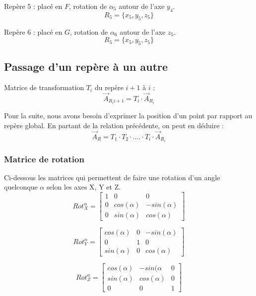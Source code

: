 \documentclass[12pt,a4paper,twoside]{article}
\begin{document}
\medbreak
Repère 5 : placé en $F$, rotation de $\alpha_5$ autour de l'axe $y_4$.
\begin{equation}
R_5=\{x_5,y_5,z_5\}
\end{equation}

\medbreak
Repère 6 : placé en $G$, rotation de $\alpha_6$ autour de l'axe $z_5$.
\begin{equation}
R_5=\{x_5,y_5,z_5\}
\end{equation}

\subsection{Passage d'un repère à un autre}
Matrice de transformation $T_i$ du repère $i+1$ à $i$ : 
\begin{equation}
\vec{A}_{R_i{i+1}}=T_i \cdot \vec{A}_{R_i}
\end{equation}

Pour la suite, nous avons besoin d'exprimer la position d'un point par rapport au repère global. En partant de la relation précédente, on peut en déduire : 
\begin{equation}
\vec{A}_R=T_1 \cdot T_2 \cdot .... \cdot T_i \cdot \vec{A}_{R_i}
\end{equation}

\subsubsection{Matrice de rotation}
Ci-dessous les matrices qui permettent de faire une rotation d'un angle quelconque $\alpha$ selon les axes X, Y et Z. 
\begin{equation}
Rot_X^{\alpha}=
\begin{bmatrix}
1 & 0 & 0\\
0 & cos(\alpha) & -sin(\alpha)\\
0 & sin(\alpha) & cos(\alpha)
\end{bmatrix}
\end{equation}

\begin{equation}
Rot_Y^{\alpha}=
\begin{bmatrix}
cos(\alpha) & 0 & -sin(\alpha)\\
0 & 1 & 0\\
sin(\alpha) & 0 & cos(\alpha)
\end{bmatrix}
\end{equation}

\begin{equation}
Rot_Z^{\alpha}=
\begin{bmatrix}
cos(\alpha) & -sin(\alpha & 0\\
sin(\alpha) & cos(\alpha) & 0\\
0 & 0 & 1
\end{bmatrix}
\end{equation}
\newpage
\end{document}
